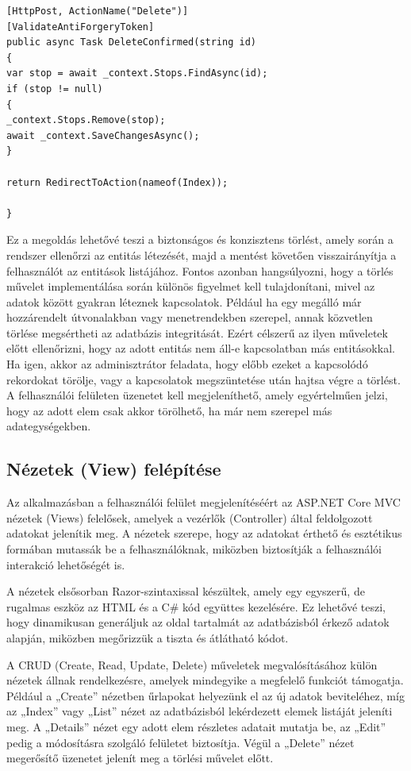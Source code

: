 \begin{lstlisting}
[HttpPost, ActionName("Delete")]
[ValidateAntiForgeryToken]
public async Task DeleteConfirmed(string id)
{
var stop = await _context.Stops.FindAsync(id);
if (stop != null)
{
_context.Stops.Remove(stop);
await _context.SaveChangesAsync();
}

return RedirectToAction(nameof(Index));

}
\end{lstlisting}

Ez a megoldás lehetővé teszi a biztonságos és konzisztens törlést, amely során a rendszer ellenőrzi az entitás létezését, majd a mentést követően visszairányítja a felhasználót az entitások listájához. Fontos azonban hangsúlyozni, hogy a törlés művelet implementálása során különös figyelmet kell tulajdonítani, mivel az adatok között gyakran léteznek kapcsolatok. Például ha egy megálló már hozzárendelt útvonalakban vagy menetrendekben szerepel, annak közvetlen törlése megsértheti az adatbázis integritását. Ezért célszerű az ilyen műveletek előtt ellenőrizni, hogy az adott entitás nem áll-e kapcsolatban más entitásokkal. Ha igen, akkor az adminisztrátor feladata, hogy előbb ezeket a kapcsolódó rekordokat törölje, vagy a kapcsolatok megszüntetése után hajtsa végre a törlést. A felhasználói felületen üzenetet kell megjeleníthető, amely egyértelműen jelzi, hogy az adott elem csak akkor törölhető, ha már nem szerepel más adategységekben.

\subsection{Nézetek (View) felépítése}

Az alkalmazásban a felhasználói felület megjelenítéséért az ASP.NET Core MVC nézetek (Views) felelősek, amelyek a vezérlők (Controller) által feldolgozott adatokat jelenítik meg. A nézetek szerepe, hogy az adatokat érthető és esztétikus formában mutassák be a felhasználóknak, miközben biztosítják a felhasználói interakció lehetőségét is.

A nézetek elsősorban Razor-szintaxissal készültek, amely egy egyszerű, de rugalmas eszköz az HTML és a C\# kód együttes kezelésére. Ez lehetővé teszi, hogy dinamikusan generáljuk az oldal tartalmát az adatbázisból érkező adatok alapján, miközben megőrizzük a tiszta és átlátható kódot.

A CRUD (Create, Read, Update, Delete) műveletek megvalósításához külön nézetek állnak rendelkezésre, amelyek mindegyike a megfelelő funkciót támogatja. Például a „Create” nézetben űrlapokat helyezünk el az új adatok beviteléhez, míg az „Index” vagy „List” nézet az adatbázisból lekérdezett elemek listáját jeleníti meg. A „Details” nézet egy adott elem részletes adatait mutatja be, az „Edit” pedig a módosításra szolgáló felületet biztosítja. Végül a „Delete” nézet megerősítő üzenetet jelenít meg a törlési művelet előtt.

